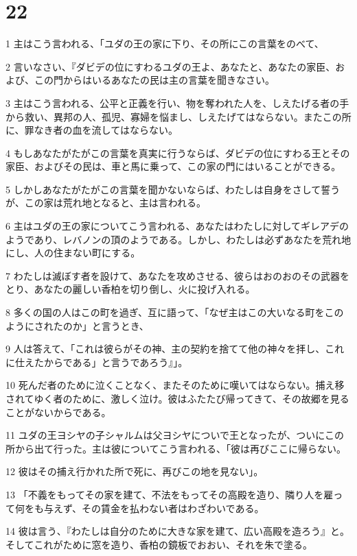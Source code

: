 \chapter{22}

\par 1 主はこう言われる、「ユダの王の家に下り、その所にこの言葉をのべて、
\par 2 言いなさい、『ダビデの位にすわるユダの王よ、あなたと、あなたの家臣、および、この門からはいるあなたの民は主の言葉を聞きなさい。
\par 3 主はこう言われる、公平と正義を行い、物を奪われた人を、しえたげる者の手から救い、異邦の人、孤児、寡婦を悩まし、しえたげてはならない。またこの所に、罪なき者の血を流してはならない。
\par 4 もしあなたがたがこの言葉を真実に行うならば、ダビデの位にすわる王とその家臣、およびその民は、車と馬に乗って、この家の門にはいることができる。
\par 5 しかしあなたがたがこの言葉を聞かないならば、わたしは自身をさして誓うが、この家は荒れ地となると、主は言われる。
\par 6 主はユダの王の家についてこう言われる、あなたはわたしに対してギレアデのようであり、レバノンの頂のようである。しかし、わたしは必ずあなたを荒れ地にし、人の住まない町にする。
\par 7 わたしは滅ぼす者を設けて、あなたを攻めさせる、彼らはおのおのその武器をとり、あなたの麗しい香柏を切り倒し、火に投げ入れる。
\par 8 多くの国の人はこの町を過ぎ、互に語って、「なぜ主はこの大いなる町をこのようにされたのか」と言うとき、
\par 9 人は答えて、「これは彼らがその神、主の契約を捨てて他の神々を拝し、これに仕えたからである」と言うであろう』」。
\par 10 死んだ者のために泣くことなく、またそのために嘆いてはならない。捕え移されてゆく者のために、激しく泣け。彼はふたたび帰ってきて、その故郷を見ることがないからである。
\par 11 ユダの王ヨシヤの子シャルムは父ヨシヤについで王となったが、ついにこの所から出て行った。主は彼についてこう言われる、「彼は再びここに帰らない。
\par 12 彼はその捕え行かれた所で死に、再びこの地を見ない」。
\par 13 「不義をもってその家を建て、不法をもってその高殿を造り、隣り人を雇って何をも与えず、その賃金を払わない者はわざわいである。
\par 14 彼は言う、『わたしは自分のために大きな家を建て、広い高殿を造ろう』と。そしてこれがために窓を造り、香柏の鏡板でおおい、それを朱で塗る。
